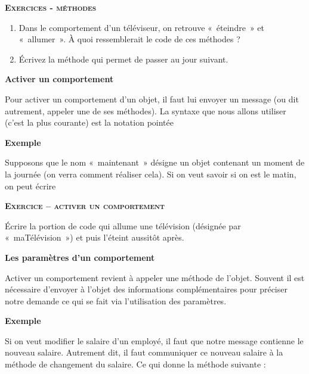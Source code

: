 {\sffamily\bfseries\scshape
Exercices - méthodes}

\liststyleWWviiiNumi
\begin{enumerate}
	\item 
		Dans le comportement d'un téléviseur, on retrouve
		«~éteindre~» et «~allumer~». À quoi ressemblerait le code de ces
		méthodes ?
	\item 
		Écrivez la méthode qui permet de passer au jour suivant.
\end{enumerate}

\bigskip

{\sffamily\bfseries
Activer un comportement}

{
Pour activer un comportement d'un objet, il faut lui
envoyer un message (ou dit autrement, appeler une de ses méthodes). La
syntaxe que nous allons utiliser (c'est la plus
courante) est la notation pointée}


{\bfseries
Exemple}

{
Supposons que le nom «~maintenant~» désigne un objet contenant un moment
de la journée (on verra comment réaliser cela). Si on veut savoir si on
est le matin, on peut écrire}



\bigskip

{\sffamily\bfseries\scshape
Exercice – activer un comportement}

Écrire la portion de code qui allume une télévision (désignée par
«~maTélévision~») et puis l'éteint aussitôt après.


\bigskip

{\sffamily\bfseries\upshape
Les paramètres d'un comportement}

{
Activer un comportement revient à appeler une méthode de
l'objet. Souvent il est nécessaire
d'envoyer à l'objet des informations
complémentaires pour préciser notre demande ce qui se fait via
l'utilisation des paramètres.}

{\bfseries
Exemple}

Si on veut modifier le salaire d'un employé, il faut
que notre message contienne le nouveau salaire. Autrement dit, il faut
communiquer ce nouveau salaire à la méthode de changement du salaire.
Ce qui donne la méthode suivante :


